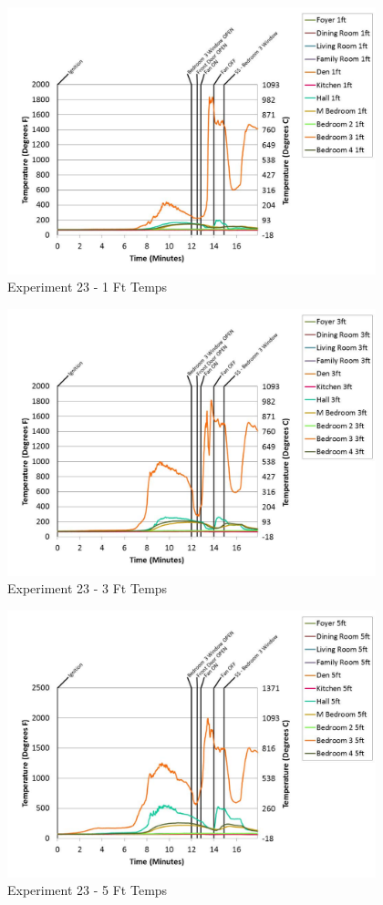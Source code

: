 \documentclass{article}
\begin{document}
\begin{appendices}
	\begin{figure}[h!]
		\centering
		\includegraphics[height=3.05in]{0_Images/Results_Charts/Exp_23_Charts/1FtTemps.pdf}
		\caption{Experiment 23 - 1 Ft Temps}
	\end{figure}
 

	\begin{figure}[h!]
		\centering
		\includegraphics[height=3.05in]{0_Images/Results_Charts/Exp_23_Charts/3FtTemps.pdf}
		\caption{Experiment 23 - 3 Ft Temps}
	\end{figure}
 
	\clearpage

	\begin{figure}[h!]
		\centering
		\includegraphics[height=3.05in]{0_Images/Results_Charts/Exp_23_Charts/5FtTemps.pdf}
		\caption{Experiment 23 - 5 Ft Temps}
	\end{figure}
 


\end{appendices}
\end{document}
